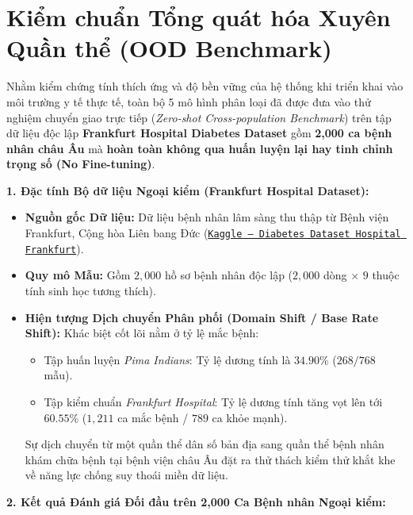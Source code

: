 \documentclass[12pt,a4paper]{report}
\begin{document}
\section{Kiểm chuẩn Tổng quát hóa Xuyên Quần thể (OOD Benchmark)}

Nhằm kiểm chứng tính thích ứng và độ bền vững của hệ thống khi triển khai vào môi trường y tế thực tế, toàn bộ 5 mô hình phân loại đã được đưa vào thử nghiệm chuyển giao trực tiếp (\textit{Zero-shot Cross-population Benchmark}) trên tập dữ liệu độc lập \textbf{Frankfurt Hospital Diabetes Dataset} gồm \textbf{2,000 ca bệnh nhân châu Âu} mà \textbf{hoàn toàn không qua huấn luyện lại hay tinh chỉnh trọng số (No Fine-tuning)}.

\textbf{1. Đặc tính Bộ dữ liệu Ngoại kiểm (Frankfurt Hospital Dataset):}
\begin{itemize}[leftmargin=1.5em]
    \item \textbf{Nguồn gốc Dữ liệu:} Dữ liệu bệnh nhân lâm sàng thu thập từ Bệnh viện Frankfurt, Cộng hòa Liên bang Đức (\href{https://www.kaggle.com/datasets/johndasilva/diabetes}{\texttt{Kaggle -- Diabetes Dataset Hospital Frankfurt}}).
    \item \textbf{Quy mô Mẫu:} Gồm $2,000$ hồ sơ bệnh nhân độc lập ($2,000$ dòng $\times$ $9$ thuộc tính sinh học tương thích).
    \item \textbf{Hiện tượng Dịch chuyển Phân phối (Domain Shift / Base Rate Shift):} Khác biệt cốt lõi nằm ở tỷ lệ mắc bệnh:
    \begin{itemize}[leftmargin=1.2em]
        \item Tập huấn luyện \textit{Pima Indians}: Tỷ lệ dương tính là $34.90\%$ ($268 / 768$ mẫu).
        \item Tập kiểm chuẩn \textit{Frankfurt Hospital}: Tỷ lệ dương tính tăng vọt lên tới \textbf{$60.55\%$} ($1,211$ ca mắc bệnh / $789$ ca khỏe mạnh).
    \end{itemize}
    Sự dịch chuyển từ một quần thể dân số bản địa sang quần thể bệnh nhân khám chữa bệnh tại bệnh viện châu Âu đặt ra thử thách kiểm thử khắt khe về năng lực chống suy thoái miền dữ liệu.
\end{itemize}

\textbf{2. Kết quả Đánh giá Đối đầu trên 2,000 Ca Bệnh nhân Ngoại kiểm:}
\end{document}
